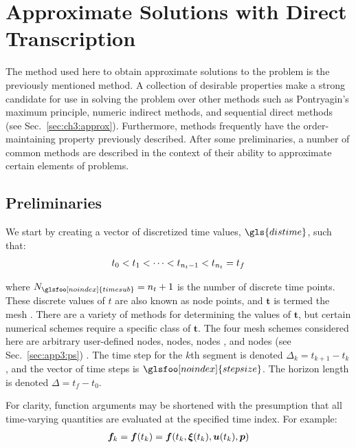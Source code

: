 \section{Approximate Solutions with Direct Transcription} \label{sec:ch5:formulation}

The method used here to obtain approximate solutions to the \lqdo{} problem is the previously mentioned  method.
A collection of desirable properties make \dt{} a strong candidate for use in solving the \lqdo{} problem over other methods such as Pontryagin's maximum principle, numeric indirect methods, and sequential direct methods (see Sec.~\ref{sec:ch3:approx}).
Furthermore, \dt{} methods frequently have the order-maintaining property previously described.
After some preliminaries, a number of common \dt{} methods are described in the context of their ability to approximate certain elements of \lqdo{} problems.

\subsection{Preliminaries}

We start by creating a vector of discretized time values, $\gls{distime}$, such that:
\begin{align}
t_0 < t_1 < \cdots < t_{n_t-1} < t_{n_t} = t_f \notag
\end{align}

\noindent where $N_{\glsfoo[noindex]{timesub}} = n_t+1$ is the number of discrete time points.
These discrete values of $t$ are also known as node points, and $\bm{t}$ is termed the mesh \cite{Betts2010a, Biegler2010a}.
There are a variety of methods for determining the values of $\bm{t}$, but certain numerical schemes require a specific class of $\bm{t}$.
The four mesh schemes considered here are arbitrary user-defined nodes,  nodes,  nodes \cite{Shen2011a, Herber2015a}, and  nodes (see Sec.~\ref{sec:app3:ps}) \cite{Fahroo2002a, Herber2015a}.
The time step for the $k$th segment is denoted $\Delta_k = t_{k+1} - t_{k}$, and the vector of time steps is $\glsfoo[noindex]{stepsize}$. The horizon length is denoted $\Delta = t_f - t_0$. 

For clarity, function arguments may be shortened with the presumption that all time-varying quantities are evaluated at the specified time index.
For example:
\begin{align}
\bm{f}_k = \bm{f}(t_k) = \bm{f}(t_k,\bm{\xi}(t_k),\bm{u}(t_k),\bm{p}) \notag
\end{align}

